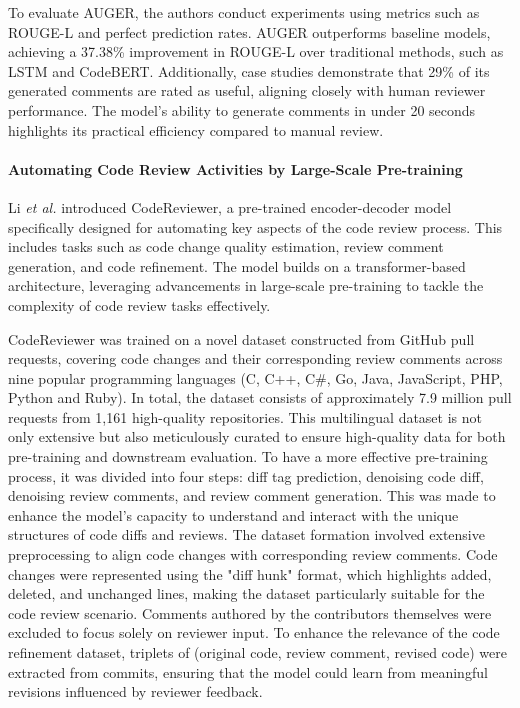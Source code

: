To evaluate AUGER, the authors conduct experiments using metrics such as
ROUGE-L and perfect prediction rates. AUGER outperforms baseline models,
achieving a 37.38\% improvement in ROUGE-L over traditional methods, such as
LSTM and CodeBERT. Additionally, case studies demonstrate that 29\% of its
generated comments are rated as useful, aligning closely with human reviewer
performance. The model's ability to generate comments in under 20 seconds
highlights its practical efficiency compared to manual review.

\paragraph{Automating Code Review Activities by Large-Scale Pre-training}

Li \emph{et al.} \cite{li.l:esecfse2022} introduced CodeReviewer, a pre-trained
encoder-decoder model specifically designed for automating key aspects of the
code review process. This includes tasks such as code change quality
estimation, review comment generation, and code refinement. The model builds on
a transformer-based architecture, leveraging advancements in large-scale
pre-training to tackle the complexity of code review tasks effectively.

CodeReviewer was trained on a novel dataset constructed from GitHub pull
requests, covering code changes and their corresponding review comments across
nine popular programming languages (C, C++, C\#, Go, Java, JavaScript, PHP,
Python and Ruby). In total, the dataset consists of approximately 7.9 million
pull requests from 1,161 high-quality repositories. This multilingual dataset
is not only extensive but also meticulously curated to ensure high-quality data
for both pre-training and downstream evaluation. To have a more effective
pre-training process, it was divided into four steps: diff tag prediction,
denoising code diff, denoising review comments, and review comment generation.
This was made to enhance the model's capacity to understand and interact with the
unique structures of code diffs and reviews. The dataset formation involved
extensive preprocessing to align code changes with corresponding review
comments. Code changes were represented using the "diff hunk" format, which
highlights added, deleted, and unchanged lines, making the dataset particularly
suitable for the code review scenario. Comments authored by the contributors
themselves were excluded to focus solely on reviewer input. To enhance the
relevance of the code refinement dataset, triplets of (original code, review
comment, revised code) were extracted from commits, ensuring that the model
could learn from meaningful revisions influenced by reviewer feedback.

